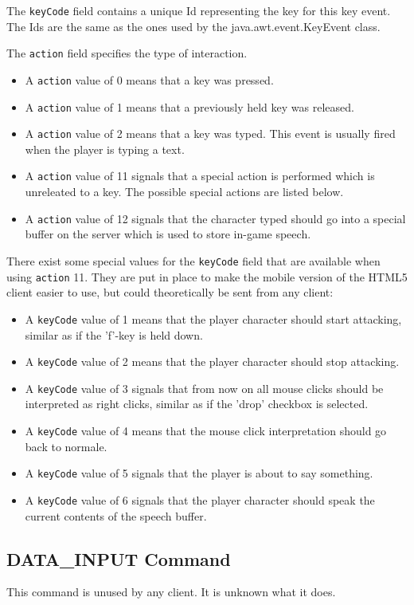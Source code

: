 \documentclass{article}
\newcommand{\field}[1]{\textcolor{fieldColor}{\texttt{#1}}}
\begin{document}
The \field{keyCode} field contains a unique Id representing the key for this key event. The Ids are the same as the ones used by the java.awt.event.KeyEvent class.

The \field{action} field specifies the type of interaction.
\begin{itemize}
\item A \field{action} value of 0 means that a key was pressed.
\item A \field{action} value of 1 means that a previously held key was released.
\item A \field{action} value of 2 means that a key was typed. This event is usually fired when the player is typing a text.
\item A \field{action} value of 11 signals that a special action is performed which is unreleated to a key. The possible special actions are listed below.
\item A \field{action} value of 12 signals that the character typed should go into a special buffer on the server which is used to store in-game speech.
\end{itemize}

There exist some special values for the \field{keyCode} field that are available when using \field{action} 11. They are put in place to make the mobile version of the HTML5 client easier to use, 
but could theoretically be sent from any client:
\begin{itemize}
\item A \field{keyCode} value of 1 means that the player character should start attacking, similar as if the 'f'-key is held down.
\item A \field{keyCode} value of 2 means that the player character should stop attacking.
\item A \field{keyCode} value of 3 signals that from now on all mouse clicks should be interpreted as right clicks, similar as if the 'drop' checkbox is selected.
\item A \field{keyCode} value of 4 means that the mouse click interpretation should go back to normale.
\item A \field{keyCode} value of 5 signals that the player is about to say something.
\item A \field{keyCode} value of 6 signals that the player character should speak the current contents of the speech buffer.
\end{itemize}

\subsection{DATA\_INPUT Command}
This command is unused by any client. It is unknown what it does.
\end{document}
